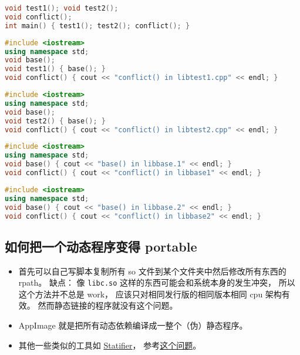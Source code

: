 \begin{lstlisting}[language=cpp, caption=main.cpp]
void test1(); void test2();
void conflict();
int main() { test1(); test2(); conflict(); }
\end{lstlisting}

\begin{lstlisting}[language=cpp, caption=libtest1.cpp]
#include <iostream>
using namespace std;
void base();
void test1() { base(); }
void conflict() { cout << "conflict() in libtest1.cpp" << endl; }
\end{lstlisting}

\begin{lstlisting}[language=cpp, caption=libtest2.cpp]
#include <iostream>
using namespace std;
void base();
void test2() { base(); }
void conflict() { cout << "conflict() in libtest2.cpp" << endl; }
\end{lstlisting}

\begin{lstlisting}[language=cpp, caption=libtest1.cpp]
#include <iostream>
using namespace std;
void base() { cout << "base() in libbase.1" << endl; }
void conflict() { cout << "conflict() in libbase1" << endl; }
\end{lstlisting}

\begin{lstlisting}[language=cpp, caption=libtest2.cpp]
#include <iostream>
using namespace std;
void base() { cout << "base() in libbase.2" << endl; }
void conflict() { cout << "conflict() in libbase2" << endl; }
\end{lstlisting}

\subsection{如何把一个动态程序变得 portable}
\begin{itemize}
\item 首先可以自己写脚本复制所有 so 文件到某个文件夹中然后修改所有东西的 rpath。 缺点： 像 \verb|libc.so| 这样的东西可能会和系统本身的发生冲突， 所以这个方法并不总是 work， 应该只对相同发行版的相同版本相同 cpu 架构有效。 然而静态链接的程序就没有这个问题。
\item AppImage 就是把所有动态依赖编译成一整个（伪）静态程序。
\item 其他一些类似的工具如 \href{https://statifier.sourceforge.net/}{Statifier}， 参考\href{https://askubuntu.com/questions/537479/is-there-any-open-source-way-to-make-a-static-from-a-dynamic-executable-with-no}{这个问题}。
\end{itemize}
